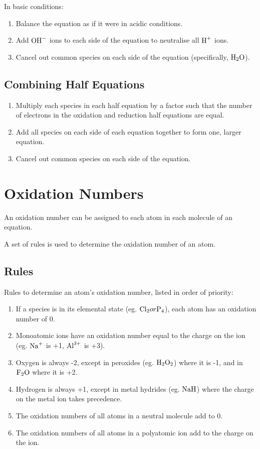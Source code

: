 \documentclass[a4paper,11pt]{article}
\begin{document}
In basic conditions:

\begin{enumerate}
\item Balance the equation as if it were in acidic conditions.
\item Add $\ce{OH-}$ ions to each side of the equation to neutralise all
	$\ce{H+}$ ions.
\item Cancel out common species on each side of the equation (specifically,
	$\ce{H2O}$).
\end{enumerate}

\subsection{Combining Half Equations}

\begin{enumerate}
\item Multiply each species in each half equation by a factor such that the
	number of electrons in the oxidation and reduction half equations are
	equal.
\item Add all species on each side of each equation together to form one, larger
	equation.
\item Cancel out common species on each side of the equation.
\end{enumerate}



\section{Oxidation Numbers}

An oxidation number can be assigned to each atom in each molecule of an
equation.

A set of rules is used to determine the oxidation number of an atom.

\subsection{Rules}

Rules to determine an atom's oxidation number, listed in order of priority:

\begin{enumerate}
\item If a species is in its elemental state (eg. $\ce{Cl2} or \ce{P4}$), each
	atom has an oxidation number of 0.
\item Monoatomic ions have an oxidation number equal to the charge on the ion
	(eg. $\ce{Na^{+}}$ is +1, $\ce{Al^{3+}}$ is +3).
\item Oxygen is always -2, except in peroxides (eg. $\ce{H2O2}$) where it is -1,
	and in $\ce{F2O}$ where it is +2.
\item Hydrogen is always +1, except in metal hydrides (eg. $\ce{NaH}$) where the
	charge on the metal ion takes precedence.
\item \label{neutral} The oxidation numbers of all atoms in a neutral molecule
	add to 0.
\item \label{ions} The oxidation numbers of all atoms in a polyatomic ion add
	to the charge on the ion.
\end{enumerate}
\end{document}

